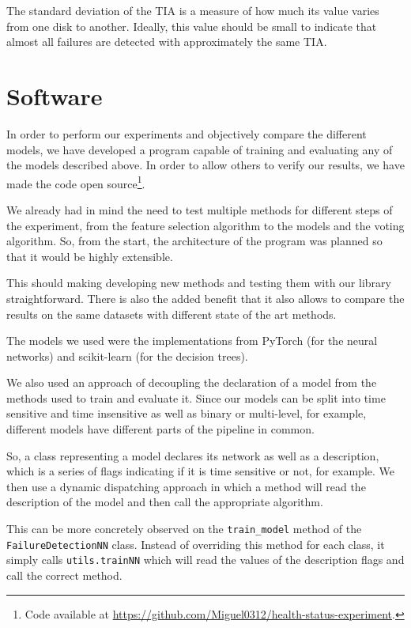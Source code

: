 The standard deviation of the TIA is a measure of how much its value varies from one disk to another.
Ideally, this value should be small to indicate that almost all failures are detected with approximately the same TIA.


\section{Software}

In order to perform our experiments and objectively compare the different models, we have developed a program capable of training and evaluating any of the models described above.
In order to allow others to verify our results, we have made the code open source\footnote{Code available at \url{https://github.com/Miguel0312/health-status-experiment}.}.

We already had in mind the need to test multiple methods for different steps of the experiment, from the feature selection algorithm to the models and the voting algorithm.
So, from the start, the architecture of the program was planned so that it would be highly extensible.

This should making developing new methods and testing them with our library straightforward.
There is also the added benefit that it also allows to compare the results on the same datasets with different state of the art methods.

The models we used were the implementations from PyTorch (for the neural networks) and scikit-learn (for the decision trees).

We also used an approach of decoupling the declaration of a model from the methods used to train and evaluate it.
Since our models can be split into time sensitive and time insensitive as well as binary or multi-level, for example, different models have different parts of the pipeline in common.

So, a class representing a model declares its network as well as a description, which is a series of flags indicating if it is time sensitive or not, for example.
We then use a dynamic dispatching approach in which a method will read the description of the model and then call the appropriate algorithm.

This can be more concretely observed on the \verb|train_model| method of the \\ \verb|FailureDetectionNN| class.
Instead of overriding this method for each class, it simply calls \verb|utils.trainNN| which will read the values of the description flags and call the correct method.

